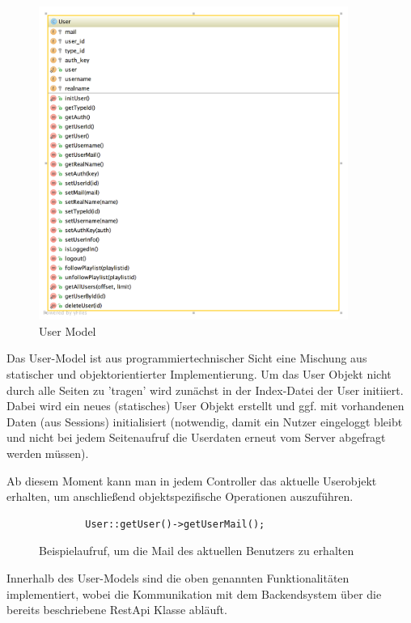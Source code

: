 \begin{figure}[H]
		\centering
        \includegraphics[width=0.9\textwidth]{./UML/User.png}
    \caption{User Model}
\end{figure}

Das User-Model ist aus programmiertechnischer Sicht eine Mischung aus statischer und objektorientierter Implementierung. Um das User Objekt nicht durch alle Seiten zu 'tragen' wird zunächst in der Index-Datei der User initiiert. Dabei wird ein neues (statisches) User Objekt erstellt und ggf. mit vorhandenen Daten (aus Sessions) initialisiert (notwendig, damit ein Nutzer eingeloggt bleibt und nicht bei jedem Seitenaufruf die Userdaten erneut vom Server abgefragt werden müssen).

\pm

Ab diesem Moment kann man in jedem Controller das aktuelle Userobjekt erhalten, um anschließend objektspezifische Operationen auszuführen.

\begin{figure}[H]
	\begin{lstlisting}
		User::getUser()->getUserMail();	
	\end{lstlisting}
	\caption{Beispielaufruf, um die Mail des aktuellen Benutzers zu erhalten}
\end{figure}

Innerhalb des User-Models sind die oben genannten Funktionalitäten implementiert, wobei die Kommunikation mit dem Backendsystem über die bereits beschriebene RestApi Klasse abläuft.

